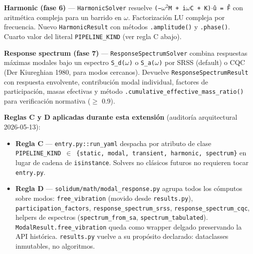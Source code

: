 \documentclass[11pt,oneside]{report}
\begin{document}
\textbf{Harmonic (fase 6)} --- \texttt{HarmonicSolver} resuelve \texttt{(−\ensuremath{\omega}\ensuremath{^{2}}M + i\ensuremath{\omega}C + K)\ensuremath{\cdot}û = F̂} con aritmética compleja para un barrido en \texttt{\ensuremath{\omega}}. Factorización LU compleja por frecuencia. Nuevo \texttt{HarmonicResult} con métodos \texttt{.amplitude()} y \texttt{.phase()}. Cuarto valor del literal \texttt{PIPELINE\_KIND} (ver regla C abajo).

\textbf{Response spectrum (fase 7)} --- \texttt{ResponseSpectrumSolver} combina respuestas máximas modales bajo un espectro \texttt{S\_d(\ensuremath{\omega})} o \texttt{S\_a(\ensuremath{\omega})} por SRSS (default) o CQC (Der Kiureghian 1980, para modos cercanos). Devuelve \texttt{ResponseSpectrumResult} con respuesta envolvente, contribución modal individual, factores de participación, masas efectivas y método \texttt{.\allowbreak{}cumulative\_\allowbreak{}effective\_\allowbreak{}mass\_\allowbreak{}ratio()} para verificación normativa (\ensuremath{\ge} 0.9).

\textbf{Reglas C y D aplicadas durante esta extensión} (auditoría arquitectural 2026-05-13):

\begin{itemize}
  \item \textbf{Regla C} --- \texttt{entry.\allowbreak{}py::run\_\allowbreak{}yaml} despacha por atributo de clase \texttt{PIPELINE\_\allowbreak{}KIND \ensuremath{\in} \{\textquotedbl{}static\textquotedbl{}, \textquotedbl{}modal\textquotedbl{}, \textquotedbl{}transient\textquotedbl{}, \textquotedbl{}harmonic\textquotedbl{}, \textquotedbl{}spectrum\textquotedbl{}\}} en lugar de cadena de \texttt{isinstance}. Solvers no clásicos futuros no requieren tocar \texttt{entry.py}.
  \item \textbf{Regla D} --- \texttt{solidum/\allowbreak{}math/\allowbreak{}modal\_\allowbreak{}response.\allowbreak{}py} agrupa todos los cómputos sobre modos: \texttt{free\_vibration} (movido desde \texttt{results.py}), \texttt{participation\_\allowbreak{}factors}, \texttt{response\_\allowbreak{}spectrum\_\allowbreak{}srss}, \texttt{response\_\allowbreak{}spectrum\_\allowbreak{}cqc}, helpers de espectros (\texttt{spectrum\_from\_sa}, \texttt{spectrum\_\allowbreak{}tabulated}). \texttt{ModalResult.\allowbreak{}free\_\allowbreak{}vibration} queda como wrapper delgado preservando la API histórica. \texttt{results.py} vuelve a su propósito declarado: dataclasses inmutables, no algoritmos.
\end{itemize}
\end{document}
